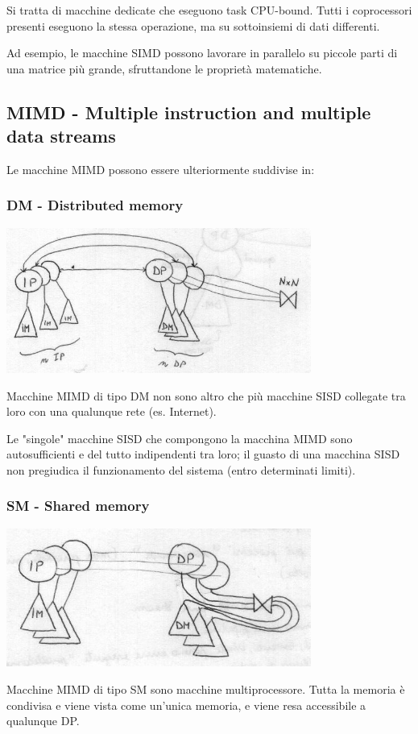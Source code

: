 \documentclass[12pt,a4paper]{article}
\begin{document}
Si tratta di macchine dedicate che eseguono task CPU-bound.
Tutti i coprocessori presenti eseguono la stessa operazione, ma su sottoinsiemi
di dati differenti.

Ad esempio, le macchine SIMD possono lavorare in parallelo su piccole parti
di una matrice più grande, sfruttandone le proprietà matematiche.

\subsection{MIMD - Multiple instruction and multiple data streams}

Le macchine MIMD possono essere ulteriormente suddivise in:
\subsubsection{DM - Distributed memory}
\centerline{\includegraphics[width=10cm]{img/flynn/mimddm.png}}
Macchine MIMD di tipo DM non sono altro che più macchine SISD collegate
tra loro con una qualunque rete (es. Internet).

Le "singole" macchine SISD che compongono la macchina MIMD sono autosufficienti
e del tutto indipendenti tra loro; il guasto di una macchina SISD non
pregiudica il funzionamento del sistema (entro determinati limiti).

\subsubsection{SM - Shared memory}
\centerline{\includegraphics[width=10cm]{img/flynn/mimdsm.png}}
Macchine MIMD di tipo SM sono macchine multiprocessore.
Tutta la memoria è condivisa e viene vista come un'unica memoria, e viene
resa accessibile a qualunque DP.
\end{document}
